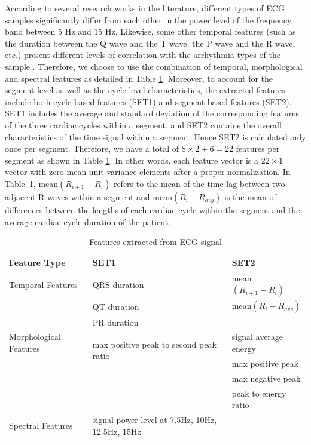 According to several research works in the literature, different types of ECG samples significantly differ from each other in the power level of the frequency band between 5 Hz and 15 Hz\cite{martinez2004wavelet}. Likewise, some other temporal features (such as the duration between the Q wave and the T wave, the P wave and the R wave, etc.) present different levels of correlation with the arrhythmia types of the sample \cite{autofs}. Therefore, we choose to use the combination of temporal, morphological and spectral features as detailed in Table \ref{table:features}. Moreover, to account for the segment-level as well as the cycle-level characteristics, the extracted features include both cycle-based features (SET1) and segment-based features (SET2). SET1 includes the average and standard deviation of the corresponding features of the three cardiac cycles within a segment, and SET2 contains the overall characteristics of the time signal within a segment. Hence SET2 is calculated only once per segment. Therefore, we have a total of \textcolor{black}{$8 \times 2 + 6 =22$} features per segment as shown in Table \ref{table:features}. In other words, each feature vector is a $22×1$ vector with zero-mean unit-variance elements after a proper normalization. %
In Table~\ref{table:features}, mean$(R_{i+1}-R_i)$ refers to the mean of the time lag between two adjacent R waves within a segment and mean$(R_i-R_{avg})$ is the mean of differences between the lengths of each cardiac cycle within the segment and the average cardiac cycle duration of the patient. 

\begin{table}[t]
	\caption{Features extracted from ECG signal}%
	\label{table:features}
	\centering
	\begin{tabular}{|m{10.5em} | m{11em} |m{11em}|}
		\hline 
		Feature Type & SET1 & SET2 \\ 
		\hline 
		Temporal Features & 
		 QRS duration &   mean$(R_{i+1}-R_i)$ \\
		& QT duration & mean$(R_i-R_{avg})$ \\
		& PR duration & \\
		\hline 
		Morphological Features &  \multirow{2}{11em}{max positive peak to second peak ratio} &  signal average energy\\
		 & &  max positive peak \\ 
		 & &  max negative peak \\ 
		 & & peak to energy ratio \\ 
		\hline 
		Spectral Features &  signal power level at 7.5Hz, 10Hz, 12.5Hz, 15Hz &  \\ 
		\hline 
	\end{tabular} 
\end{table}

